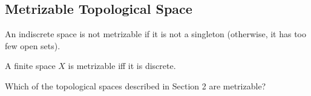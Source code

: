 \subsection{Metrizable Topological Space}

\begin{majorEx}
    An indiscrete space is not metrizable if it is not a singleton (otherwise,
    it has too few open sets).
\end{majorEx}

\begin{majorEx}
    A finite space $X$ is metrizable iff it is discrete.
\end{majorEx}

\begin{minorEx}
    Which of the topological spaces described in Section 2 are metrizable?
\end{minorEx}
